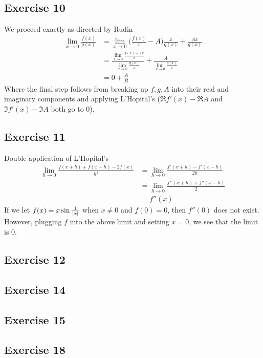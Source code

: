 \subsection{Exercise 10}
We proceed exactly as directed by Rudin
\begin{align*}
        \lim_{x \to 0} \frac{f(x)}{g(x)} &= \lim_{x \to 0} \bigg(\frac{f(x)}{x} - A\bigg) \frac{x}{g(x)} + \frac{Ax}{g(x)} \\
                                         &= \frac{\lim_{x \to 0} \frac{f(x) - Ax}{x}}{\lim_{x \to 0} \frac{g(x)}{x}} + \frac{A}{\lim_{x \to 0} \frac{g(x)}{x}} \\
                                         &= 0 + \frac{A}{B}
\end{align*}
Where the final step follows from breaking up $f, g, A$ into their real and imaginary components and applying
L'Hopital's ($\Re f'(x) - \Re A$ and $\Im f'(x) - \Im A$ both go to 0).

\subsection{Exercise 11}
Double application of L'Hopital's
\begin{align*}
        \lim_{h \to 0} \frac{f(x + h) + f(x - h) - 2f(x)}{h^2} &= \lim_{h \to 0} \frac{f'(x + h) - f'(x - h)}{2h} \\
                                                               &= \lim_{h \to 0} \frac{f''(x + h) + f''(x - h)}{2} \\
                                                               &= f''(x)
\end{align*}
If we let $f(x) = x \sin \frac{1}{\abs{x}}$ when $x \neq 0$ and $f(0) = 0$, then $f''(0)$ does not exist. 
However, plugging $f$ into the above limit and setting $x = 0$, we see that the limit is 0.

\subsection{Exercise 12}

\subsection{Exercise 14}

\subsection{Exercise 15}

\subsection{Exercise 18}
